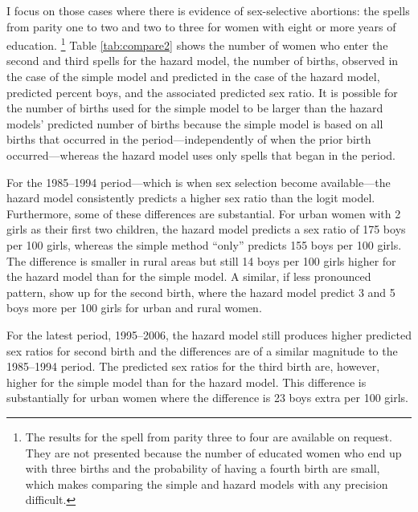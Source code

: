 \documentclass[12pt,letterpaper]{article}
\begin{document}
I focus on those cases where there is evidence of sex-selective abortions: the spells
from parity one to two and two to three for women with eight or more years of education.%
\footnote{
The results for the spell from parity three to four are available on request.
They are not presented because the number of educated women who end up with three births 
and the probability of having a fourth birth are small, which makes
comparing the simple and hazard models with any precision difficult.
}
Table \ref{tab:compare2} shows the number of women who enter the second and third spells
for the hazard model,
the number of births, observed in the case of the simple model and predicted in the case 
of the hazard model, predicted percent boys, and the associated predicted sex ratio.
It is possible for the number of births used for the simple model to be larger than the
hazard models' predicted number of births because the simple model is based
on all births that occurred in the period---independently of when the prior birth
occurred---whereas the hazard model uses only spells that began in the period. 

%



For the 1985--1994 period---which is when sex selection become available---the 
hazard model consistently predicts a higher sex ratio than the logit model.
Furthermore, some of these differences are substantial.
For urban women with 2 girls as their first two children, the hazard model
predicts a sex ratio of 175 boys per 100 girls, whereas the simple method
``only'' predicts 155 boys per 100 girls.
The difference is smaller in rural areas but still 14 boys per 100 girls
higher for the hazard model than for the simple model.
A similar, if less pronounced pattern, show up for the second birth,
where the hazard model predict 3 and 5 boys more per 100 girls for
urban and rural women.

For the latest period, 1995--2006, the hazard model still produces higher 
predicted sex ratios for second birth and the differences are of a 
similar magnitude to the 1985--1994 period.
The predicted sex ratios for the third birth are, however, 
higher for the simple model than for the hazard model.
This difference is substantially for urban women where the difference 
is 23 boys extra per 100 girls.  
\end{document}
